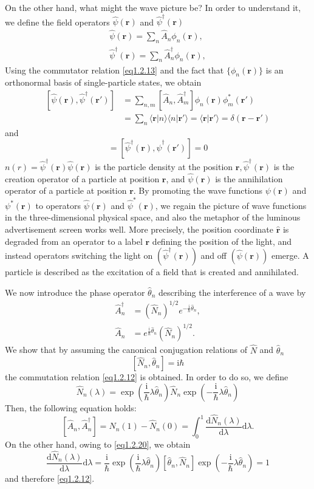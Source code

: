 \documentclass[twoside,11pt]{report}
\def\be{\begin{equation}}
\def\ee{\end{equation}}
\def\ii{\text{i}}
\def\dd{\text{d}}
\begin{document}
On the other hand, what might the wave picture be? In order to understand it, we define the field operators $\hat{\psi}(\bm r)$ and $\hat{\psi}^\dagger(\bm r)$
\be\label{eq1.2.16}\begin{split}
\hat{\psi}(\bm{r})=\sum_n\hat{A}_n\phi_n(\bm{r}),\\
\hat{\psi}^\dagger(\bm{r})=\sum_n\hat{A}^\dagger_n\phi_n(\bm{r}),
\end{split}\ee
Using the commutator relation \eqref{eq1.2.13} and the fact that $\{\phi_n(\bm r)\}$ is an orthonormal basis of single-particle states, we obtain
\be\begin{split}
[\hat{\psi}(\bm{r}),\hat{\psi}^\dagger(\bm{r}')]&=\sum_{n,m}[\hat{A}_n,\hat{A}_m^\dagger]\phi_n(\bm{r})\phi_m^*(\bm{r}')\\
&=\sum_n\langle\bm{r}|n\rangle\langle n|\bm{r}'\rangle=\langle \bm{r}|\bm{r}'\rangle=\delta(\bm{r}-\bm{r}')
\end{split}\ee
and
\be
[\hat{\psi}(\bm{r}),\hat{\psi}(\bm{r}')]=[\hat{\psi}^\dagger(\bm{r}),\hat{\psi}^\dagger(\bm{r}')]=0
\ee
$n(r) = \hat{\psi}^\dagger(\bm r)\hat\psi(\bm r)$ is the particle density at the position $\bm r, \hat\psi^\dagger(\bm r)$ is the creation operator of a particle at position $\bm r$, and $\hat\psi(\bm r)$ is the annihilation operator of a particle at position $\bm r$. By promoting the wave functions $\psi(\bm r)$ and $\psi^*(\bm r)$ to operators $\hat\psi(\bm r)$ and $\hat\psi^*(\bm r)$, we regain the picture of wave functions in the three-dimensional physical space, and also the metaphor of the luminous advertisement screen works well. More precisely, the position coordinate $\hat{\bm r}$ is degraded from an operator to a label $\bm r$ defining the position of the light, and instead operators switching the light on $(\hat\psi^\dagger(\bm r))$ and off $(\hat\psi(\bm r))$ emerge. A particle is described as the excitation of a field that is created and annihilated.

We now introduce the phase operator $\hat\theta_n$ describing the interference of a wave by
\be\begin{split}
\hat A_n^\dagger&=(\hat N_n)^{1/2}e^{-\frac{\ii}{\hbar}\hat\theta_n},\\
\hat A_n&=e^{\frac{\ii}{\hbar}\hat\theta_n}(\hat N_n)^{1/2}.
\end{split}\ee
We show that by assuming the canonical conjugation relations of $\hat N$ and $\hat\theta_n$
\be\label{eq1.2.20}
[\hat{N}_n,\hat{\theta}_n]=\ii\hbar
\ee
the commutation relation \eqref{eq1.2.12} is obtained. In order to do so, we define 
\be
\hat N_n(\lambda)=\exp\left(\frac{\ii}{\hbar}\lambda\hat\theta_n\right)\hat N_n\exp\left(-\frac{\ii}{\hbar}\lambda\hat\theta_n\right)
\ee
Then, the following equation holds:
\be\label{eq1.2.22}
[\hat{A}_n,\hat{A}_n^\dagger]=\hat N_n(1)-\hat N_n(0)=\int_0^1\frac{\dd\hat N_n(\lambda)}{\dd\lambda}\dd\lambda. 
\ee
On the other hand, owing to \eqref{eq1.2.20}, we obtain
\be
\frac{\dd\hat N_n(\lambda)}{\dd\lambda}\dd\lambda=\frac{\ii}{\hbar}\exp\left(\frac{\ii}{\hbar}\lambda\hat\theta_n\right)[\hat\theta_n,\hat N_n]\exp\left(-\frac{\ii}{\hbar}\lambda\hat\theta_n\right)=1
\ee
and therefore \eqref{eq1.2.12}.
\end{document}
